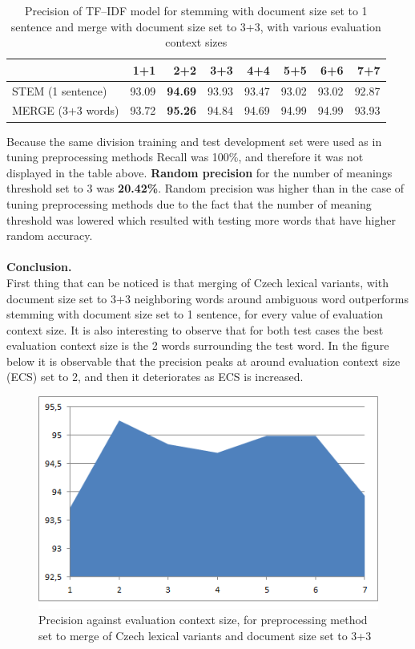 \begin{table}[h!]
\begin{tabular}{ l | r r r r r r r }
    &  1+1 & 2+2 & 3+3 & 4+4 & 5+5 & 6+6 & 7+7 \\
\hline
STEM (1 sentence)  & 93.09 & \textbf{94.69} & 93.93 & 93.47 & 93.02 & 93.02 & 92.87 \\
MERGE (3+3 words) & 93.72 & \textbf{95.26} & 94.84 & 94.69 & 94.99 & 94.99 & 93.93 \\
\end{tabular}
\caption{Precision of TF--IDF model for stemming with document size set to 1 sentence and merge with document size set to 3+3, with various evaluation context sizes}
\end{table} 

Because the same division training and test development set were used as in tuning preprocessing methods Recall was 100\%, and therefore it was not displayed in the table above. 
\textbf{Random precision} for the number of meanings threshold set to 3 was \textbf{20.42\%}. Random precision was higher than in the case of tuning preprocessing methods due to the fact that the number of meaning threshold was lowered which resulted with testing more words that have higher random accuracy. 
\\\\
\textbf{Conclusion.}\\
First thing that can be noticed is that merging of Czech lexical variants, with document size set to 3+3 
neighboring words around ambiguous word outperforms stemming with document size set to 1 sentence, 
for every value of evaluation context size. It is also interesting to observe that for both test cases the best 
evaluation context size is the 2 words surrounding the test word. In the figure below it is observable that 
the precision peaks at around evaluation context size (ECS) set to 2, and then it deteriorates as ECS is increased.
\begin{figure}[h!]
\includegraphics{img/precision-evalContSize_merge.png}
\caption{Precision against evaluation context size, for preprocessing method set to merge of Czech lexical variants and document size set to 3+3}
\end{figure}

